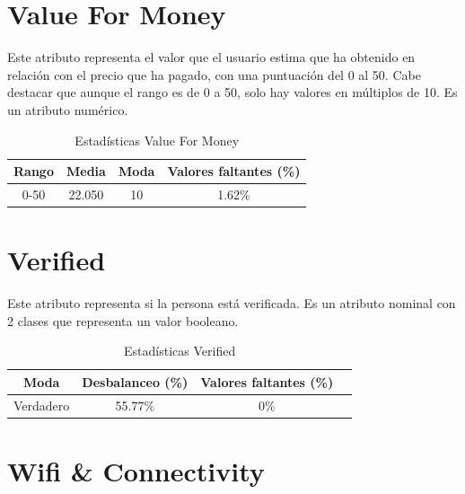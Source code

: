\documentclass[12pt]{report} %
\begin{document}
    \section{Value For Money}

    Este atributo representa el valor que el usuario estima que ha obtenido en relación con
    el precio que ha pagado, con una puntuación del 0 al 50. Cabe destacar que aunque el
    rango es de 0 a 50, solo hay valores en múltiplos de 10. Es un atributo numérico.

    \begin{table}[H]
        \begin{center}
            \begin{tabular}{ @{}cccc@{} }
                \toprule
                Rango & Media & Moda & Valores faltantes (\%) \\
                \midrule
                0-50 & 22.050 & 10 & 1.62\% \\
                \bottomrule
            \end{tabular}
            \caption{Estadísticas Value For Money}
        \end{center}
    \end{table}

    \section{Verified}

    Este atributo representa si la persona está verificada. Es un atributo nominal
    con 2 clases que representa un valor booleano.

    \begin{table}[H]
        \begin{center}
            \begin{tabular}{ @{}cccc@{} }
                \toprule
                Moda & Desbalanceo (\%) & Valores faltantes (\%) \\
                \midrule
                Verdadero & 55.77\% & 0\% \\
                \bottomrule
            \end{tabular}
            \caption{Estadísticas Verified}
        \end{center}
    \end{table}

    \section{Wifi \& Connectivity}
\end{document}
